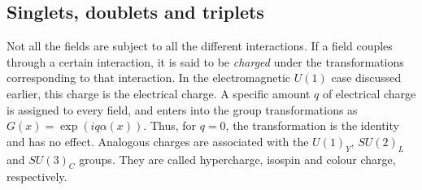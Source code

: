\documentclass[twoside,english]{uiofysmaster}
\begin{document}

\subsection{Singlets, doublets and triplets}

Not all the fields are subject to all the different interactions. If a field couples through a certain interaction, it is said to be {\it charged} under the transformations corresponding to that interaction. In the electromagnetic $U(1)$ case discussed earlier, this charge is the electrical charge. A specific amount $q$ of electrical charge is assigned to every field, and enters into the group transformations as $G(x) = \exp(iq\alpha(x))$. Thus, for $q=0$, the transformation is the identity and has no effect. Analogous charges are associated with the $U(1)_Y$, $SU(2)_L$ and $SU(3)_C$ groups. They are called hypercharge, isospin and colour charge, respectively.
\end{document}
